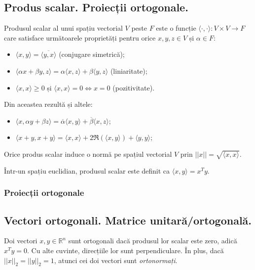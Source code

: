 \documentclass{exam}
\begin{document}
\subsection{Produs scalar. Proiecții ortogonale.}

\par Produsul scalar al unui spațiu vectorial $V$ peste $F$ este o funcție
$\langle \cdot, \cdot \rangle: V \times V \rightarrow F$ care satisface
următoarele proprietăți pentru orice $x, y, z \in V$ și $\alpha \in F$:

\begin{itemize}
	\item $\langle x, y \rangle = \overline{\langle y, x \rangle}$ (conjugare simetrică);
	\item $\langle \alpha x + \beta y, z \rangle = \alpha \langle x, z \rangle + \beta \langle y, z \rangle$ (liniaritate);
	\item $\langle x, x \rangle \geq 0$ și $\langle x, x \rangle = 0 \Leftrightarrow x = 0$ (pozitivitate).
\end{itemize}

\par Din aceastea rezultă și altele:

\begin{itemize}
	\item $\langle x, \alpha y + \beta z \rangle = \overline{\alpha} \langle x, y \rangle + \overline{\beta} \langle x, z \rangle$;
	\item $\langle x + y, x + y \rangle = \langle x, x \rangle + 2 \Re(\langle x, y \rangle) +\langle y, y \rangle$;
\end{itemize}

\par Orice produs scalar induce o normă pe spațiul vectorial $V$ prin
$||x|| = \sqrt{\langle x, x \rangle}$.

\par Într-un spațiu euclidian, produsul
scalar este definit ca $\langle x, y \rangle = x^Ty$.

\subsubsection{Proiecții ortogonale}

\subsection{Vectori ortogonali. Matrice unitară/ortogonală.}

\par Doi vectori $x, y \in \mathbb{R}^n$ sunt ortogonali dacă produsul lor
scalar este zero, adică $x^Ty = 0$. Cu alte cuvinte, direcțiile lor sunt
perpendiculare. În plus, dacă $||x||_2 = ||y||_2 = 1$, atunci cei doi
vectori sunt \textit{ortonormați}.
\end{document}
